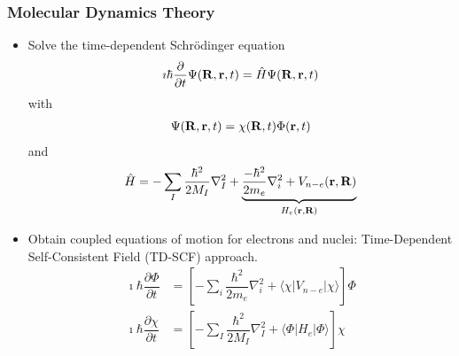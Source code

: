 \documentclass[slidestop,mathserif,compress,xcolor=svgnames]{beamer}
\begin{document}
\begin{frame}
\frametitle{\small Molecular Dynamics Theory}
\footnotesize{
\begin{itemize}
\item Solve the time-dependent Schr\"{o}dinger equation
\begin{align*}
\imath\hbar\dfrac{\partial}{\partial t}\Psi({\bf R},{\bf r},t) = \hat{H}\Psi({\bf R},{\bf r},t)
\end{align*}
with 
\begin{align*}
\Psi({\bf R},{\bf r},t) = \chi({\bf R},t)\Phi({\bf r},t)
\end{align*}
and 
\begin{align*}
\hat{H} = -\sum_I\dfrac{\hbar^2}{2M_I}\nabla^2_I +\underbrace{\dfrac{-\hbar^2}{2m_e}\nabla^2_i + V_{n-e}(\bf r,R)}_{H_e(\bf r,R)}
\end{align*}
\item Obtain coupled equations of motion for electrons and nuclei: Time-Dependent Self-Consistent Field (TD-SCF) approach.
\begin{align*}
\imath\hbar\dfrac{\partial\Phi}{\partial t} &= \left[-\sum_i\dfrac{\hbar^2}{2m_e}\nabla^2_i + \langle\chi|V_{n-e}|\chi\rangle\right]\Phi\\
\imath\hbar\dfrac{\partial\chi}{\partial t} &= \left[-\sum_I\dfrac{\hbar^2}{2M_I}\nabla^2_I + \langle\Phi|H_e|\Phi\rangle\right]\chi
\end{align*}
\end{itemize}
}
\end{frame}
\end{document}
